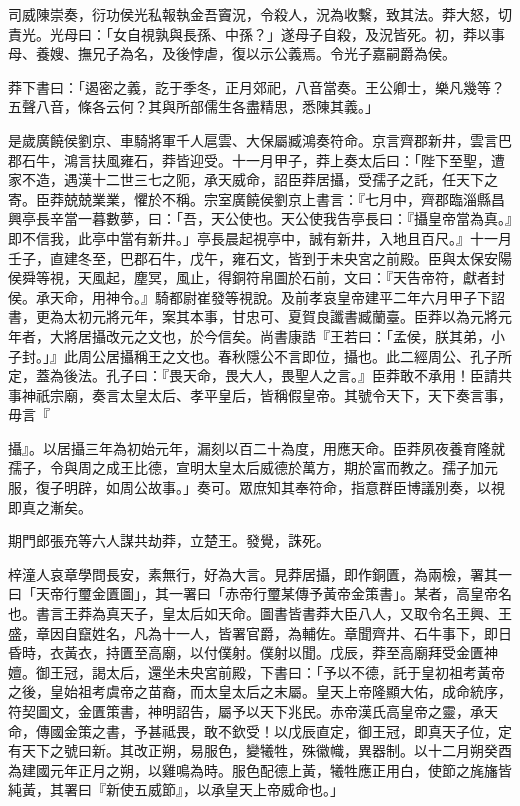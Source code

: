 \begin{pinyinscope}
司威陳崇奏，衍功侯光私報執金吾竇況，令殺人，況為收繫，致其法。莽大怒，切責光。光母曰：「女自視孰與長孫、中孫？」遂母子自殺，及況皆死。初，莽以事母、養嫂、撫兄子為名，及後悖虐，復以示公義焉。令光子嘉嗣爵為侯。

莽下書曰：「遏密之義，訖于季冬，正月郊祀，八音當奏。王公卿士，樂凡幾等？五聲八音，條各云何？其與所部儒生各盡精思，悉陳其義。」

是歲廣饒侯劉京、車騎將軍千人扈雲、大保屬臧鴻奏符命。京言齊郡新井，雲言巴郡石牛，鴻言扶風雍石，莽皆迎受。十一月甲子，莽上奏太后曰：「陛下至聖，遭家不造，遇漢十二世三七之阨，承天威命，詔臣莽居攝，受孺子之託，任天下之寄。臣莽兢兢業業，懼於不稱。宗室廣饒侯劉京上書言：『七月中，齊郡臨淄縣昌興亭長辛當一暮數夢，曰：「吾，天公使也。天公使我告亭長曰：『攝皇帝當為真。』即不信我，此亭中當有新井。」亭長晨起視亭中，誠有新井，入地且百尺。』十一月壬子，直建冬至，巴郡石牛，戊午，雍石文，皆到于未央宮之前殿。臣與太保安陽侯舜等視，天風起，塵冥，風止，得銅符帛圖於石前，文曰：『天告帝符，獻者封侯。承天命，用神令。』騎都尉崔發等視說。及前孝哀皇帝建平二年六月甲子下詔書，更為太初元將元年，案其本事，甘忠可、夏賀良讖書臧蘭臺。臣莽以為元將元年者，大將居攝改元之文也，於今信矣。尚書康誥『王若曰：「孟侯，朕其弟，小子封。」』此周公居攝稱王之文也。春秋隱公不言即位，攝也。此二經周公、孔子所定，蓋為後法。孔子曰：『畏天命，畏大人，畏聖人之言。』臣莽敢不承用！臣請共事神祇宗廟，奏言太皇太后、孝平皇后，皆稱假皇帝。其號令天下，天下奏言事，毋言『

攝』。以居攝三年為初始元年，漏刻以百二十為度，用應天命。臣莽夙夜養育隆就孺子，令與周之成王比德，宣明太皇太后威德於萬方，期於富而教之。孺子加元服，復子明辟，如周公故事。」奏可。眾庶知其奉符命，指意群臣博議別奏，以視即真之漸矣。

期門郎張充等六人謀共劫莽，立楚王。發覺，誅死。

梓潼人哀章學問長安，素無行，好為大言。見莽居攝，即作銅匱，為兩檢，署其一曰「天帝行璽金匱圖」，其一署曰「赤帝行璽某傳予黃帝金策書」。某者，高皇帝名也。書言王莽為真天子，皇太后如天命。圖書皆書莽大臣八人，又取令名王興、王盛，章因自竄姓名，凡為十一人，皆署官爵，為輔佐。章聞齊井、石牛事下，即日昏時，衣黃衣，持匱至高廟，以付僕射。僕射以聞。戊辰，莽至高廟拜受金匱神嬗。御王冠，謁太后，還坐未央宮前殿，下書曰：「予以不德，託于皇初祖考黃帝之後，皇始祖考虞帝之苗裔，而太皇太后之末屬。皇天上帝隆顯大佑，成命統序，符契圖文，金匱策書，神明詔告，屬予以天下兆民。赤帝漢氏高皇帝之靈，承天命，傳國金策之書，予甚祗畏，敢不欽受！以戊辰直定，御王冠，即真天子位，定有天下之號曰新。其改正朔，易服色，變犧牲，殊徽幟，異器制。以十二月朔癸酉為建國元年正月之朔，以雞鳴為時。服色配德上黃，犧牲應正用白，使節之旄旛皆純黃，其署曰『新使五威節』，以承皇天上帝威命也。」


\end{pinyinscope}
